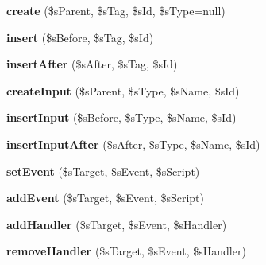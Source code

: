 \begin{DoxyCompactItemize}
\item 
\hypertarget{classxajaxResponse_ad9cdf23f8cc08ab2aece7a7135abea73}{
{\bfseries create} (\$sParent, \$sTag, \$sId, \$sType=null)}
\label{classxajaxResponse_ad9cdf23f8cc08ab2aece7a7135abea73}

\item 
\hypertarget{classxajaxResponse_a936da86d80611477b668e0e1589c6802}{
{\bfseries insert} (\$sBefore, \$sTag, \$sId)}
\label{classxajaxResponse_a936da86d80611477b668e0e1589c6802}

\item 
\hypertarget{classxajaxResponse_acfe2ec850f69bc2e9a02c6c1090c1479}{
{\bfseries insertAfter} (\$sAfter, \$sTag, \$sId)}
\label{classxajaxResponse_acfe2ec850f69bc2e9a02c6c1090c1479}

\item 
\hypertarget{classxajaxResponse_abb9078d52e22368239f993176efe07b8}{
{\bfseries createInput} (\$sParent, \$sType, \$sName, \$sId)}
\label{classxajaxResponse_abb9078d52e22368239f993176efe07b8}

\item 
\hypertarget{classxajaxResponse_acc5c6f6b6eb1cf8582d993a0389841dd}{
{\bfseries insertInput} (\$sBefore, \$sType, \$sName, \$sId)}
\label{classxajaxResponse_acc5c6f6b6eb1cf8582d993a0389841dd}

\item 
\hypertarget{classxajaxResponse_a28c55d076d21256b5896f61092773a84}{
{\bfseries insertInputAfter} (\$sAfter, \$sType, \$sName, \$sId)}
\label{classxajaxResponse_a28c55d076d21256b5896f61092773a84}

\item 
\hypertarget{classxajaxResponse_a6e5e16c4b9d3c7af81aed0dce4501442}{
{\bfseries setEvent} (\$sTarget, \$sEvent, \$sScript)}
\label{classxajaxResponse_a6e5e16c4b9d3c7af81aed0dce4501442}

\item 
\hypertarget{classxajaxResponse_acef199f64dbb71bc4fd2eef38e240395}{
{\bfseries addEvent} (\$sTarget, \$sEvent, \$sScript)}
\label{classxajaxResponse_acef199f64dbb71bc4fd2eef38e240395}

\item 
\hypertarget{classxajaxResponse_a09993704e8d1b8f890452b69e6881208}{
{\bfseries addHandler} (\$sTarget, \$sEvent, \$sHandler)}
\label{classxajaxResponse_a09993704e8d1b8f890452b69e6881208}

\item 
\hypertarget{classxajaxResponse_a4bfc6e2c0fbcb6563b2272256076ff4f}{
{\bfseries removeHandler} (\$sTarget, \$sEvent, \$sHandler)}
\label{classxajaxResponse_a4bfc6e2c0fbcb6563b2272256076ff4f}


\end{DoxyCompactItemize}
